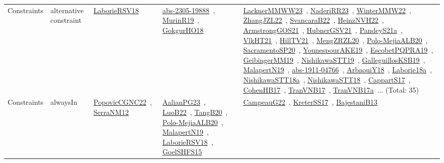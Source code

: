 {\begin{longtable}{lp{3cm}>{\raggedright\arraybackslash}p{6cm}>{\raggedright\arraybackslash}p{6cm}>{\raggedright\arraybackslash}p{8cm}}
Constraints & alternative constraint & \href{works/LaborieRSV18.pdf}{LaborieRSV18}~\cite{LaborieRSV18} & \href{works/abs-2305-19888.pdf}{abs-2305-19888}~\cite{abs-2305-19888}, \href{works/MurinR19.pdf}{MurinR19}~\cite{MurinR19}, \href{works/GokgurHO18.pdf}{GokgurHO18}~\cite{GokgurHO18} & \href{works/LacknerMMWW23.pdf}{LacknerMMWW23}~\cite{LacknerMMWW23}, \href{works/NaderiRR23.pdf}{NaderiRR23}~\cite{NaderiRR23}, \href{works/WinterMMW22.pdf}{WinterMMW22}~\cite{WinterMMW22}, \href{works/ZhangJZL22.pdf}{ZhangJZL22}~\cite{ZhangJZL22}, \href{works/SvancaraB22.pdf}{SvancaraB22}~\cite{SvancaraB22}, \href{works/HeinzNVH22.pdf}{HeinzNVH22}~\cite{HeinzNVH22}, \href{works/ArmstrongGOS21.pdf}{ArmstrongGOS21}~\cite{ArmstrongGOS21}, \href{works/HubnerGSV21.pdf}{HubnerGSV21}~\cite{HubnerGSV21}, \href{works/PandeyS21a.pdf}{PandeyS21a}~\cite{PandeyS21a}, \href{works/VlkHT21.pdf}{VlkHT21}~\cite{VlkHT21}, \href{works/HillTV21.pdf}{HillTV21}~\cite{HillTV21}, \href{works/MengZRZL20.pdf}{MengZRZL20}~\cite{MengZRZL20}, \href{works/Polo-MejiaALB20.pdf}{Polo-MejiaALB20}~\cite{Polo-MejiaALB20}, \href{works/SacramentoSP20.pdf}{SacramentoSP20}~\cite{SacramentoSP20}, \href{works/YounespourAKE19.pdf}{YounespourAKE19}~\cite{YounespourAKE19}, \href{works/EscobetPQPRA19.pdf}{EscobetPQPRA19}~\cite{EscobetPQPRA19}, \href{works/GeibingerMM19.pdf}{GeibingerMM19}~\cite{GeibingerMM19}, \href{works/NishikawaSTT19.pdf}{NishikawaSTT19}~\cite{NishikawaSTT19}, \href{works/GalleguillosKSB19.pdf}{GalleguillosKSB19}~\cite{GalleguillosKSB19}, \href{works/MalapertN19.pdf}{MalapertN19}~\cite{MalapertN19}, \href{works/abs-1911-04766.pdf}{abs-1911-04766}~\cite{abs-1911-04766}, \href{works/ArbaouiY18.pdf}{ArbaouiY18}~\cite{ArbaouiY18}, \href{works/Laborie18a.pdf}{Laborie18a}~\cite{Laborie18a}, \href{works/NishikawaSTT18a.pdf}{NishikawaSTT18a}~\cite{NishikawaSTT18a}, \href{works/NishikawaSTT18.pdf}{NishikawaSTT18}~\cite{NishikawaSTT18}, \href{works/CappartS17.pdf}{CappartS17}~\cite{CappartS17}, \href{works/CohenHB17.pdf}{CohenHB17}~\cite{CohenHB17}, \href{works/TranVNB17.pdf}{TranVNB17}~\cite{TranVNB17}, \href{works/TranVNB17a.pdf}{TranVNB17a}~\cite{TranVNB17a}... (Total: 35)\\
Constraints & alwaysIn & \href{works/PopovicCGNC22.pdf}{PopovicCGNC22}~\cite{PopovicCGNC22}, \href{works/SerraNM12.pdf}{SerraNM12}~\cite{SerraNM12} & \href{works/AalianPG23.pdf}{AalianPG23}~\cite{AalianPG23}, \href{works/LuoB22.pdf}{LuoB22}~\cite{LuoB22}, \href{works/TangB20.pdf}{TangB20}~\cite{TangB20}, \href{works/Polo-MejiaALB20.pdf}{Polo-MejiaALB20}~\cite{Polo-MejiaALB20}, \href{works/MalapertN19.pdf}{MalapertN19}~\cite{MalapertN19}, \href{works/LaborieRSV18.pdf}{LaborieRSV18}~\cite{LaborieRSV18}, \href{works/GoelSHFS15.pdf}{GoelSHFS15}~\cite{GoelSHFS15} & \href{works/CampeauG22.pdf}{CampeauG22}~\cite{CampeauG22}, \href{works/KreterSS17.pdf}{KreterSS17}~\cite{KreterSS17}, \href{works/BajestaniB13.pdf}{BajestaniB13}~\cite{BajestaniB13}\\

\end{longtable}}
